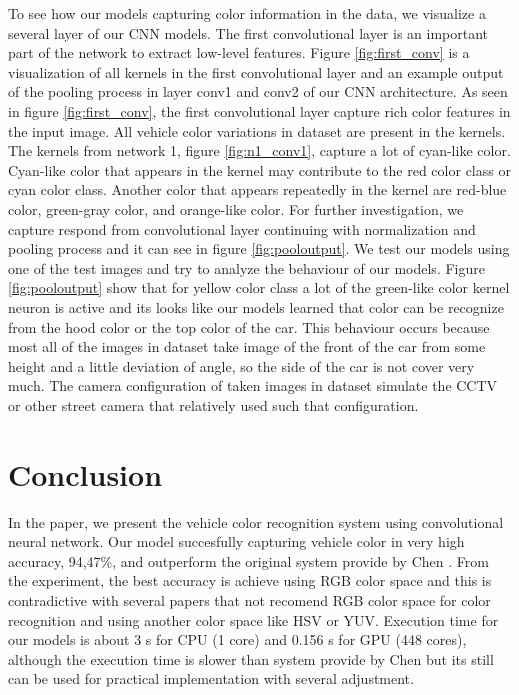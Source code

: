 \documentclass[conference]{IEEEtran}
\begin{document}
To see how our models capturing color information in the data, we visualize a several layer of our CNN models. The first convolutional layer is an important part of the network to extract low-level features. Figure \ref{fig:first_conv} is a visualization of all kernels in the first convolutional layer and an example output of the pooling process in layer conv1 and conv2 of our CNN architecture. As seen in figure \ref{fig:first_conv}, the first convolutional layer capture rich color features in the input image. 
All vehicle color variations in dataset are present in the kernels. The kernels from network 1, figure \ref{fig:n1_conv1}, capture a lot of cyan-like color. Cyan-like color that appears in the kernel may contribute to the red color class or cyan color class. Another color that appears repeatedly in the kernel are red-blue color, green-gray color, and orange-like color. 
For further investigation, we capture respond from convolutional layer continuing with normalization and pooling process and it can see in figure \ref{fig:pooloutput}. We test our models using one of the test images and try to analyze the behaviour of our models. Figure \ref{fig:pooloutput} show that for yellow color class a lot of the green-like color kernel neuron is active and its looks like our models learned that color can be recognize from the hood color or the top color of the car. This behaviour occurs because most all of the images in dataset take image of the front of the car from some height and a little deviation of angle, so the side of the car is not cover very much. The camera configuration of taken images in dataset simulate the CCTV or other street camera that relatively used such that configuration. 

\section{Conclusion}
In the paper, we present the vehicle color recognition system using convolutional neural network. Our model succesfully capturing vehicle color in very high accuracy, 94,47\%, and outperform the original system provide by Chen \cite{pchen}. From the experiment, the best accuracy is achieve using RGB color space and this is contradictive with several papers that not recomend RGB color space for color recognition and using another color space like HSV or YUV. Execution time for our models is about 3 s for CPU (1 core) and 0.156 s for GPU (448 cores), although the execution time is slower than system provide by Chen \cite{pchen} but its still can be used for practical implementation with several adjustment.
\end{document}
